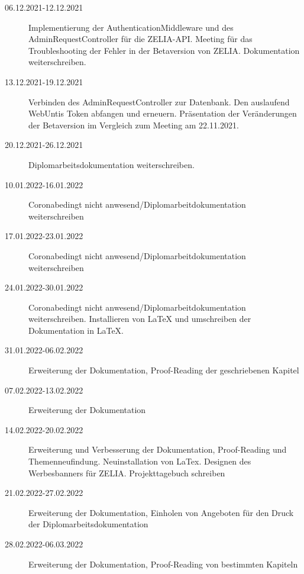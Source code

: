 \begin{description}
    \item[06.12.2021-12.12.2021] Implementierung der AuthenticationMiddleware und des AdminRequestController für die ZELIA-API. Meeting für das Troubleshooting der Fehler in der Betaversion von ZELIA. Dokumentation weiterschreiben. 
    \item[13.12.2021-19.12.2021] Verbinden des AdminRequestController zur Datenbank. Den auslaufend WebUntis Token abfangen und erneuern. Präsentation der Veränderungen der Betaversion im Vergleich zum Meeting am 22.11.2021.
    \item[20.12.2021-26.12.2021] Diplomarbeitsdokumentation weiterschreiben.
    \item[10.01.2022-16.01.2022] Coronabedingt nicht anwesend/Diplomarbeitdokumentation weiterschreiben
    \item[17.01.2022-23.01.2022] Coronabedingt nicht anwesend/Diplomarbeitdokumentation weiterschreiben
    \item[24.01.2022-30.01.2022] Coronabedingt nicht anwesend/Diplomarbeitdokumentation weiterschreiben. Installieren von LaTeX und umschreiben der Dokumentation in LaTeX.
    \item[31.01.2022-06.02.2022] Erweiterung der Dokumentation, Proof-Reading der geschriebenen Kapitel
    \item[07.02.2022-13.02.2022] Erweiterung der Dokumentation
    \item[14.02.2022-20.02.2022] Erweiterung und Verbesserung der Dokumentation, Proof-Reading und Themenneufindung. Neuinstallation von LaTex. Designen des Werbesbanners für ZELIA. Projekttagebuch schreiben
    \item[21.02.2022-27.02.2022] Erweiterung der Dokumentation, Einholen von Angeboten für den Druck der Diplomarbeitsdokumentation
    \item[28.02.2022-06.03.2022] Erweiterung der Dokumentation, Proof-Reading von bestimmten Kapiteln
    \item[] 
\end{description}